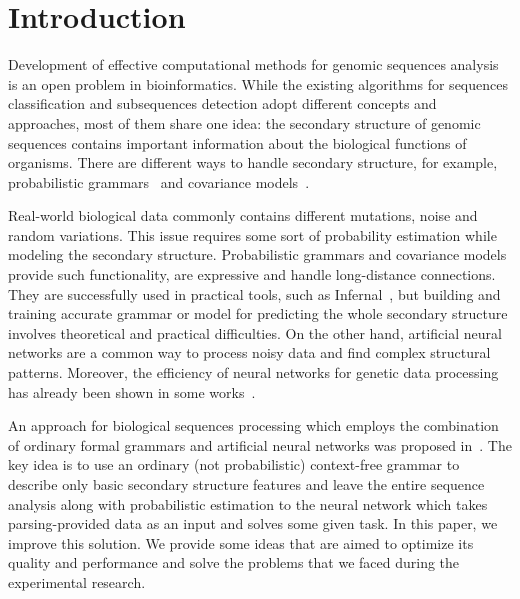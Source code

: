\section{Introduction}
Development of effective computational methods for genomic sequences analysis is an open problem in bioinformatics.
While the existing algorithms for sequences classification and subsequences detection adopt different concepts and approaches, most of them share one idea: the secondary structure of genomic sequences contains important information about the biological functions of organisms.
There are different ways to handle secondary structure, for example, probabilistic grammars~\cite{dowell2004evaluation,knudsen1999rna} and covariance models~\cite{EddyDurbin,10.1093/nar/22.11.2079}.

Real-world biological data commonly contains different mutations, noise and random variations.
This issue requires some sort of probability estimation while modeling the secondary structure.
Probabilistic grammars and covariance models provide such functionality, are expressive and handle long-distance connections.
They are successfully used in practical tools, such as Infernal~\cite{Infernal}, but building and training accurate grammar or model for predicting the whole secondary structure involves theoretical and practical difficulties.
On the other hand, artificial neural networks are a common way to process noisy data and find complex structural patterns.
Moreover, the efficiency of neural networks for genetic data processing has already been shown in some works~\cite{ANN,Lu2019,Humidor,Singh2019,10.5555/166459.166465}.

An approach for biological sequences processing which employs the combination of ordinary formal grammars and artificial neural networks was proposed in~\cite{grigorevcomposition}.  
The key idea is to use an ordinary (not probabilistic)  context-free grammar to describe only basic secondary structure features and leave the entire sequence analysis along with probabilistic estimation to the neural network which takes parsing-provided data as an input and solves some given task.
In this paper, we improve this solution. 
We provide some ideas that are aimed to optimize its quality and performance and solve the problems that we faced during the experimental research.


